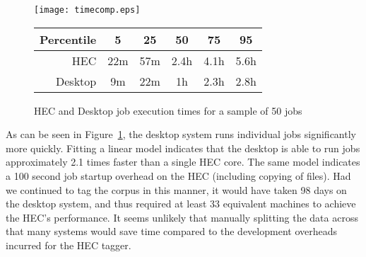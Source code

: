 \begin{figure}[h]
    \centering
    \texttt{[image: timecomp.eps]}


    \begin{tabular}{ | r | c | c | c | c | c | }
        \hline
        Percentile & 5 & 25 & 50 & 75 & 95 \\ \hline
        HEC        & 22m & 57m & 2.4h & 4.1h & 5.6h \\ \hline
        Desktop    & 9m & 22m & 1h & 2.3h & 2.8h \\ \hline
    \end{tabular}

    \caption{HEC and Desktop job execution times for a sample of 50 jobs}
    \label{fig:timecomp}
\end{figure}


As can be seen in Figure~\ref{fig:timecomp}, the desktop system runs individual jobs significantly more quickly.  Fitting a linear model indicates that the desktop is able to run jobs approximately 2.1 times faster than a single HEC core.  The same model indicates a 100 second job startup overhead on the HEC (including copying of files).
Had we continued to tag the corpus in this manner, it would have taken 98 days on the desktop system, and thus required at least 33 equivalent machines to achieve the HEC's performance.  It seems unlikely that manually splitting the data across that many systems would save time compared to the development overheads incurred for the HEC tagger.
